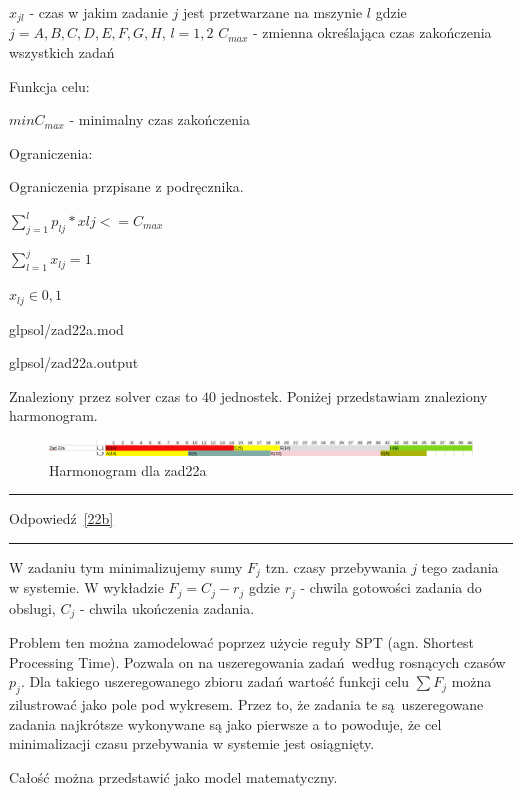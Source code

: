 \documentclass{article}
\begin{document}
$x_{jl}$ - czas w jakim zadanie $j$ jest przetwarzane na mszynie $l$ gdzie $j = {A,B,C,D,E,F,G,H}$, $l = {1,2}$ 
$C_{max}$ - zmienna określająca czas zakończenia wszystkich zadań

\noindent Funkcja celu:

$min C_{max}$ - minimalny czas zakończenia

\noindent Ograniczenia:

Ograniczenia przpisane z podręcznika.

$\sum^{l}_{j = 1} p_{lj}*x{lj} <= C_{max}$

$\sum^{j}_{l = 1} x_{lj} = 1$

$x_{lj} \in {0,1}$


{glpsol/zad22a.mod}


{glpsol/zad22a.output}

Znaleziony przez solver czas to $40$ jednostek. Poniżej przedstawiam znaleziony harmonogram.

\begin{figure}[h]    
  \centering    
  \includegraphics[width=\linewidth]{others/zad22a_harmonogram.png}
  \caption{Harmonogram dla zad22a}
\end{figure}

\par\noindent\rule{\textwidth}{0.4pt}
Odpowiedź \ref{22b}
\par\noindent\rule{\textwidth}{0.4pt}

W zadaniu tym minimalizujemy sumy $F_j$ tzn. czasy przebywania $j$ tego zadania w systemie. W wykładzie 
$F_j = C_j - r_j$ gdzie $r_j$ - chwila gotowości zadania do obslugi, $C_j$ - chwila ukończenia zadania.

Problem ten można zamodelować poprzez użycie reguły SPT (agn. Shortest Processing Time). Pozwala on na uszeregowania zadań według rosnących czasów $p_j$. Dla takiego uszeregowanego zbioru zadań wartość funkcji celu $\sum{}F_j$ można zilustrować jako pole pod wykresem. Przez to, że zadania te są uszeregowane zadania najkrótsze wykonywane są jako pierwsze a to powoduje, że cel minimalizacji czasu przebywania w systemie jest osiągnięty.

Całość można przedstawić jako model matematyczny.
\end{document}
